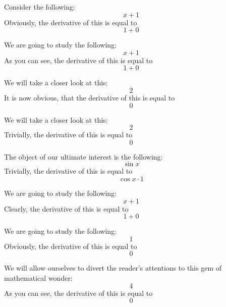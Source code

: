 \documentclass{article}
\begin{document}
Consider the following:
\begin{equation}
x + 1 
\end{equation}
Obviously, the derivative of this is equal to
\begin{equation}
1 + 0 
\end{equation}

We are going to study the following:
\begin{equation}
x + 1 
\end{equation}
As you can see, the derivative of this is equal to
\begin{equation}
1 + 0 
\end{equation}

We will take a closer look at this:
\begin{equation}
2 
\end{equation}
It is now obvious, that the derivative of this is equal to
\begin{equation}
0 
\end{equation}

We will take a closer look at this:
\begin{equation}
2 
\end{equation}
Trivially, the derivative of this is equal to
\begin{equation}
0 
\end{equation}

The object of our ultimate interest is the following:
\begin{equation}
\sin x 
\end{equation}
Trivially, the derivative of this is equal to
\begin{equation}
\cos x \cdot 1 
\end{equation}

We are going to study the following:
\begin{equation}
x + 1 
\end{equation}
Clearly, the derivative of this is equal to
\begin{equation}
1 + 0 
\end{equation}

We are going to study the following:
\begin{equation}
1 
\end{equation}
Obviously, the derivative of this is equal to
\begin{equation}
0 
\end{equation}

We will allow ourselves to divert the reader's attentions to this gem of mathematical wonder:
\begin{equation}
4 
\end{equation}
As you can see, the derivative of this is equal to
\begin{equation}
0 
\end{equation}
\end{document}
